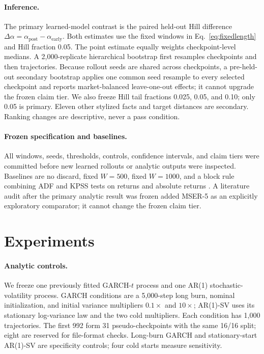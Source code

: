 \documentclass{article}
\begin{document}
\paragraph{Inference.}
The primary learned-model contrast is the paired held-out Hill difference
$\Delta\alpha=\alpha_{\mathrm{post}}-\alpha_{\mathrm{early}}$. Both estimates use the fixed windows in
Eq.~\eqref{eq:fixedlength} and Hill fraction 0.05. The point estimate equally weights checkpoint-level
medians. A 2,000-replicate hierarchical bootstrap first resamples checkpoints and then trajectories.
Because rollout seeds are shared across checkpoints, a pre-held-out secondary bootstrap applies one
common seed resample to every selected checkpoint and reports market-balanced leave-one-out effects;
it cannot upgrade the frozen claim tier.
We also freeze Hill tail fractions 0.025, 0.05, and 0.10; only 0.05 is primary.
Eleven other stylized facts and target distances are secondary. Ranking changes are descriptive,
never a pass condition.

\paragraph{Frozen specification and baselines.}
All windows, seeds, thresholds, controls, confidence intervals, and claim tiers were committed before
new learned rollouts or analytic outputs were inspected. Baselines are no discard, fixed $W=500$,
fixed $W=1000$, and a block rule combining ADF and KPSS tests on returns and absolute returns
\citep{dickey1979,kpss1992}. A literature audit after the primary analytic result was frozen added
MSER-5 as an explicitly exploratory comparator; it cannot change the frozen claim tier.

\section{Experiments}

\paragraph{Analytic controls.}
We freeze one previously fitted GARCH-$t$ process and one AR(1) stochastic-volatility process. GARCH
conditions are a 5,000-step long burn, nominal initialization, and initial variance multipliers
$0.1\times$ and $10\times$; AR(1)-SV uses its stationary log-variance law and the two cold multipliers.
Each condition has 1,000 trajectories. The first 992 form 31 pseudo-checkpoints with the same
16/16 split; eight are reserved for file-format checks. Long-burn GARCH and stationary-start AR(1)-SV
are specificity controls; four cold starts measure sensitivity.
\end{document}
